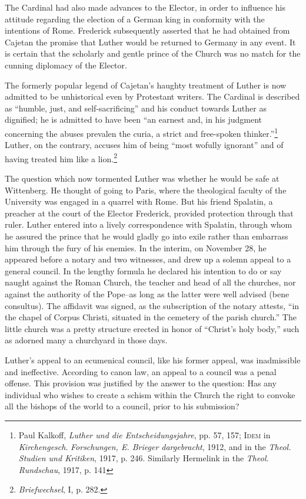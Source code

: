 The Cardinal had also made advances to the Elector, in order to
influence his attitude regarding the election of a German king in
conformity with the intentions of Rome. Frederick subsequently
asserted that he had obtained from Cajetan the promise that Luther
would be returned to Germany in any event. It is certain that the
scholarly and gentle prince of the Church was no match for the
cunning diplomacy of the Elector.

The formerly popular legend of Cajetan’s haughty treatment of
Luther is now admitted to be unhistorical even by Protestant writers.
The Cardinal is described as “humble, just, and self-sacrificing” and
his conduct towards Luther as dignified; he is admitted to have been
“an earnest and, in his judgment concerning the abuses prevalen
the curia, a strict and free-spoken thinker.”\footnote{Paul Kalkoff, \textit{Luther und die Entscheidungsjahre}, pp. 57, 157; \textsc{Idem} in \textit{Kirchengesch}.
\textit{Forschungen, E. Brieger dargebracht}, 1912, and in the \textit{Theol. Studien und Kritiken}, 1917,
p. 246. Similarly Hermelink in the \textit{Theol. Rundschau}, 1917, p. 141}
Luther, on the
contrary, accuses him of being “most wofully ignorant” and of having
treated him like a lion.\footnote{\textit{Briefwechsel}, I, p. 282.}

The question which now tormented Luther was whether he would
be safe at Wittenberg. He thought of going to Paris, where the
theological faculty of the University was engaged in a quarrel with
Rome. But his friend Spalatin, a preacher at the court of the Elector
Frederick, provided protection through that ruler. Luther entered
into a lively correspondence with Spalatin, through whom he assured
the prince that he would gladly go into exile rather than embarrass
him through the fury of his enemies. In the interim, on November
28, he appeared before a notary and two witnesses, and drew up a
solemn appeal to a general council. In the lengthy formula he declared
his intention to do or say naught against the Roman Church, the
teacher and head of all the churches, nor against the authority of
the Pope--as long as the latter were well advised (bene consultus).
The affidavit was signed, as the subscription of the notary attests, “in
the chapel of Corpus Christi, situated in the cemetery of the parish
church.” The little church was a pretty structure erected in honor
of “Christ’s holy body,” such as adorned many a churchyard in those
days.

Luther’s appeal to an ecumenical council, like his former appeal,
was inadmissible and ineffective. According to canon law, an appeal
to a council was a penal offense. This provision was justified by the
answer to the question: Has any individual who wishes to create a
schism within the Church the right to convoke all the bishops of
the world to a council, prior to his submission?

